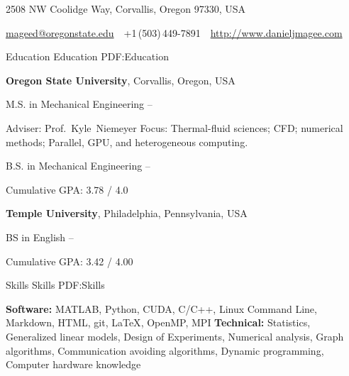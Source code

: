 \documentclass[letterpaper,MMMyyyy,nonstopmode]{simpleresumecv}
\newcommand{\CVAuthor}{Daniel J. Magee}
\newcommand{\CVWebpage}{http://www.danieljmagee.com}
\begin{document}

\Title{\CVAuthor}

\begin{SubTitle}
{2508 NW Coolidge Way, Corvallis, Oregon 97330, USA}
\par
\href{mailto:mageed@oregonstate.edu}
{mageed@oregonstate.edu}
\,\SubBulletSymbol\,
+1\,(503)\,449-7891
\,\SubBulletSymbol\,
\href{\CVWebpage}
{\url{\CVWebpage}}
\end{SubTitle}

\begin{Body}


\Section
{Education}
{Education}
{PDF:Education}

\Entry
\textbf{Oregon State University},
Corvallis, Oregon, USA

\BulletItem
M.S. in Mechanical Engineering
\hfill
{} --

\begin{Detail}
\SubBulletItem
Adviser:
Prof.~Kyle~Niemeyer
\SubBulletItem
Focus:
Thermal-fluid sciences; CFD; numerical methods; Parallel, GPU, and heterogeneous computing.
\end{Detail}

\BulletItem
B.S. in 
{Mechanical Engineering}
\hfill
{} --

\begin{Detail}
\SubBulletItem
Cumulative GPA: 3.78 / 4.0
\end{Detail}

\BigGap
\Entry
\textbf{Temple University},
Philadelphia, Pennsylvania, USA

\BulletItem
BS in English
\hfill
{} --

\begin{Detail}
\SubBulletItem
Cumulative GPA: 3.42 / 4.00
\end{Detail}


\Section
{Skills}
{Skills}
{PDF:Skills}

\Entry
\textbf{Software:} 
MATLAB,
Python,
CUDA,
C/C++,
Linux Command Line,
Markdown,
HTML,
git,
{\LaTeX},
OpenMP,
MPI
\newline
\textbf{Technical:}
Statistics, 
Generalized linear models, 
Design of Experiments, 
Numerical analysis, 
Graph algorithms,
Communication avoiding algorithms,
Dynamic programming,
Computer hardware knowledge


\end{Body}
\end{document}
